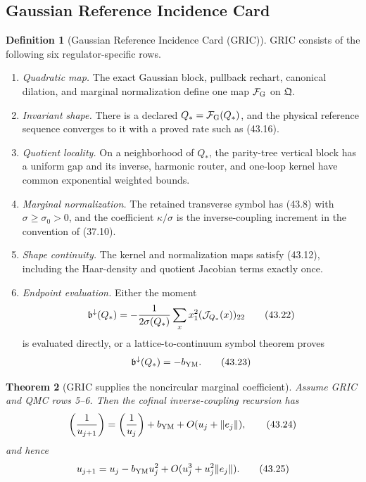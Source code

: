 \documentclass[11pt,oneside]{book}
\newtheorem{theorem}{Theorem}[chapter]
\theoremstyle{definition}
\newtheorem{definition}[theorem]{Definition}
\theoremstyle{remark}
\begin{document}
\subsection{Gaussian Reference Incidence Card}

\begin{definition}[Gaussian Reference Incidence Card (GRIC)]
\label{def:e8v43-GRIC}
GRIC consists of the following six regulator-specific rows.
\begin{enumerate}
\item \emph{Quadratic map.}  The exact Gaussian block, pullback
      rechart, canonical dilation, and marginal normalization define
      one map \({\cal F}_{\rm G}\) on \(\mathfrak Q\).
\item \emph{Invariant shape.}  There is a declared
      \(Q_*={\cal F}_{\rm G}(Q_*)\), and the physical reference
      sequence converges to it with a proved rate such as (43.16).
\item \emph{Quotient locality.}  On a neighborhood of \(Q_*\), the
      parity-tree vertical block has a uniform gap and its inverse,
      harmonic router, and one-loop kernel have common exponential
      weighted bounds.
\item \emph{Marginal normalization.}  The retained transverse symbol
      has (43.8) with \(\sigma\ge\sigma_0>0\), and the coefficient
      \(\kappa/\sigma\) is the inverse-coupling increment in the
      convention of (37.10).
\item \emph{Shape continuity.}  The kernel and normalization maps
      satisfy (43.12), including the Haar-density and quotient
      Jacobian terms exactly once.
\item \emph{Endpoint evaluation.}  Either the moment
      \[
       \mathfrak b^\downarrow(Q_*)
       =-\frac{1}{2\sigma(Q_*)}
         \sum_xx_1^2({\cal J}_{Q_*}(x))_{22}                    \tag{43.22}
      \]
      is evaluated directly, or a lattice-to-continuum symbol theorem
      proves
      \[
       \mathfrak b^\downarrow(Q_*)=-b_{\rm YM}.                 \tag{43.23}
      \]
\end{enumerate}
\end{definition}

\begin{theorem}[GRIC supplies the noncircular marginal coefficient]
\label{thm:e8v43-GRIC}
Assume GRIC and QMC rows 5--6.  Then the cofinal inverse-coupling
recursion has
\[
 \left(\frac1{u_{j+1}}\right)
 =\left(\frac1{u_j}\right)+b_{\rm YM}
 +O(u_j+\|e_j\|),                                               \tag{43.24}
\]
and hence
\[
 u_{j+1}=u_j-b_{\rm YM}u_j^2
 +O(u_j^3+u_j^2\|e_j\|).                                       \tag{43.25}
\]
\end{theorem}
\end{document}
